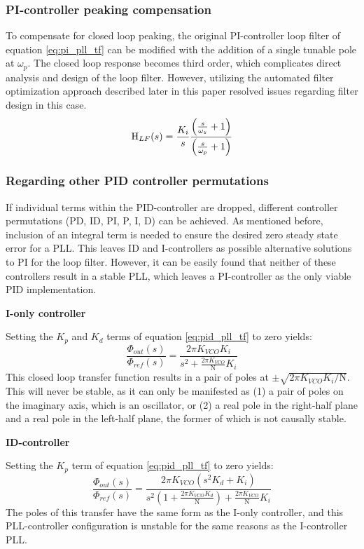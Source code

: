 \subsubsection{PI-controller peaking compensation}
 To compensate for closed loop peaking, the original PI-controller loop filter of equation \ref{eq:pi_pll_tf} can be modified with the addition of a single tunable pole at $\omega_p$. The closed loop response becomes third order, which complicates direct analysis and design of the loop filter. However, utilizing the automated filter optimization approach described later in this paper resolved issues regarding filter design in this case.
\begin{equation} \label{eq:pi_compensated_tf}
	\textnormal{H}_{LF}(s) = \frac{K_i}{s}\frac{\left(\frac{s}{\omega_z} + 1\right)}{\left(\frac{s}{\omega_p} + 1\right)}
\end{equation}

\subsubsection{Regarding other PID controller permutations} \label{other_pid}
If individual terms within the PID-controller are dropped, different controller permutations (PD, ID, PI, P, I, D) can be achieved. As mentioned before, inclusion of an integral term is needed to ensure the desired zero steady state error for a PLL. This leaves ID and I-controllers as possible alternative solutions to PI for the loop filter. However, it can be easily found that neither of these controllers result in a stable PLL, which leaves a PI-controller as the only viable PID implementation.

\textbf{I-only controller}

Setting the $K_p$ and $K_d$ terms of equation \ref{eq:pid_pll_tf} to zero yields:
\begin{equation}
	\frac{\Phi_{out}(s)}{\Phi_{ref}(s)} = \frac{2\pi K_{VCO}K_i}{s^2 + \frac{2\pi K_{VCO}}{\mathrm{N}}K_i}
\end{equation}
This closed loop transfer function results in a pair of poles at $\pm\sqrt{2\pi K_{VCO}K_i/\mathrm{N}}$. This will never be stable, as it can only be manifested as (1) a pair of poles on the imaginary axis, which is an oscillator, or (2) a real pole in the right-half plane and a real pole in the left-half plane, the former of which is not causally stable.

\textbf{ID-controller}

Setting the $K_p$ term of equation \ref{eq:pid_pll_tf} to zero yields:
\begin{equation}
	\frac{\Phi_{out}(s)}{\Phi_{ref}(s)} = \frac{2\pi K_{VCO}\left(s^2K_d + K_i\right)}{s^2\left(1 + \frac{2\pi K_{VCO}K_d}{\mathrm{N}}\right) + \frac{2\pi K_{VCO}}{\mathrm{N}} K_i}
\end{equation}
The poles of this transfer have the same form as the I-only controller, and this PLL-controller configuration is unstable for the same reasons as the I-controller PLL.